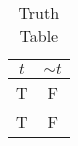 \begin{table}[ht]
\caption{Truth Table}
\centering
\begin{tabular}{|c||c|}
\hline
$ t $ & $  \sim t $ \\
\hline
T & F \\
T & F \\
\hline
\end{tabular}
\label{table:tt1}
\end{table}
